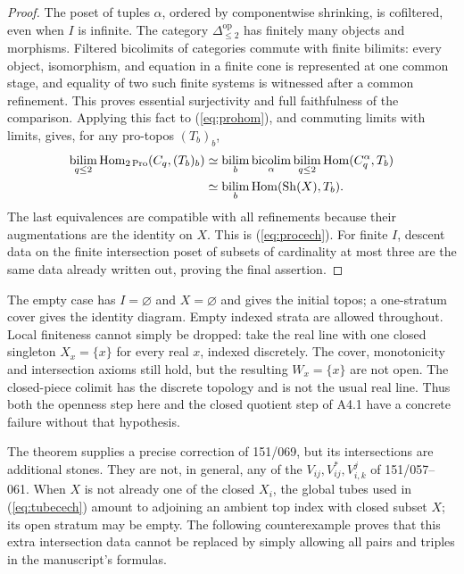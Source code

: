 \begin{proof}
The poset of tuples $\alpha$, ordered by componentwise shrinking, is
cofiltered, even when $I$ is infinite. The category
$\Delta_{\leq2}^{\mathrm{op}}$ has finitely many objects and morphisms.
Filtered bicolimits of categories commute with finite bilimits: every
object, isomorphism, and equation in a finite cone is represented at one
common stage, and equality of two such finite systems is witnessed after
a common refinement. This proves essential surjectivity and full
faithfulness of the comparison. Applying this fact to
(\ref{eq:prohom}), and commuting limits with limits, gives, for any
pro-topos $(T_b)_b$,
\begin{align*}
 \mathop{\mathrm{bilim}}_{q\leq2}\operatorname{Hom}_{2\operatorname{Pro}}(C_q,(T_b)_b)
 &\simeq\mathop{\mathrm{bilim}}_b
     \mathop{\mathrm{bicolim}}_\alpha
     \mathop{\mathrm{bilim}}_{q\leq2}\operatorname{Hom}(C_q^\alpha,T_b)\\
 &\simeq\mathop{\mathrm{bilim}}_b\operatorname{Hom}(\operatorname{Sh}(X),T_b).
\end{align*}
The last equivalences are compatible with all refinements because their
augmentations are the identity on $X$. This is
(\ref{eq:procech}). For finite $I$, descent data on the finite intersection
poset of subsets of cardinality at most three are the same data already
written out, proving the final assertion.
\end{proof}

The empty case has $I=\varnothing$ and $X=\varnothing$ and gives the
initial topos; a one-stratum cover gives the identity diagram. Empty
indexed strata are allowed throughout. Local finiteness cannot simply
be dropped: take the real line with one closed singleton $X_x=\{x\}$
for every real $x$, indexed discretely. The cover, monotonicity and
intersection axioms still hold, but the resulting $W_x=\{x\}$ are not
open. The closed-piece colimit has the discrete topology and is not
the usual real line. Thus both the openness step here and the closed
quotient step of A4.1 have a concrete failure without that hypothesis.

The theorem supplies a precise correction of 151/069, but its intersections
are additional stones. They are not, in general, any of the
$V_{ij},V_{ij}^*,V_{i,k}^j$ of 151/057--061. When $X$ is not already one of
the closed $X_i$, the global tubes used in (\ref{eq:tubecech}) amount to
adjoining an ambient top index with closed subset $X$; its open stratum may
be empty. The following counterexample proves that this extra intersection
data cannot be replaced by simply allowing all pairs and triples in the
manuscript's formulas.

